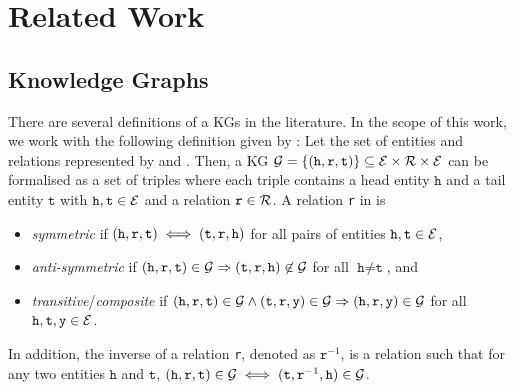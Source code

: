\chapter{Related Work}
\label{ch:relatedwork}

\section{Knowledge Graphs} 
There are several definitions of a \acp{KG} in the literature. 
In the scope of this work, we work with the following definition given by \cite{ConEx, RotatE}:
Let the set of entities and relations represented by \entities and \relations.
Then, a \ac{KG} $\mathcal{G}= \{(\texttt{h}, \texttt{r}, \texttt{t}) \}  \subseteq \mathcal{E} \times \mathcal{R} \times \mathcal{E}$ can be formalised as a set of triples where each triple contains a head entity $\texttt{h}$ and a tail entity $\texttt{t}$ with $\texttt{h}, \texttt{t} \in \mathcal{E}$ and a relation $\texttt{r} \in \mathcal{R}$. 
A relation \texttt{r} in \kg is
\begin{itemize}
    \item 
    \emph{symmetric} if $(\texttt{h}, \texttt{r}, \texttt{t}) \iff (\texttt{t}, \texttt{r}, \texttt{h})$ for all pairs of entities $\texttt{h},\texttt{t}\in \mathcal{E}$, 
   
   \item 
   \emph{anti-symmetric} if $(\texttt{h}, \texttt{r}, \texttt{t}) \in \mathcal{G} \Rightarrow (\texttt{t}, \texttt{r}, \texttt{h}) \not \in \mathcal{G}$ for all $\texttt{h} \not= \texttt{t}$, and
    
    \item 
    \emph{transitive}/\emph{composite} if $(\texttt{h}, \texttt{r}, \texttt{t})\in\mathcal{G} \wedge (\texttt{t}, \texttt{r}, \texttt{y}) \in \mathcal{G}  \Rightarrow (\texttt{h}, \texttt{r}, \texttt{y}) \in \mathcal{G}$ for all $\texttt{h},\texttt{t},\texttt{y}\in \mathcal{E}$.
\end{itemize}
In addition, the inverse of a relation \texttt{r}, denoted as $\texttt{r}^{-1}$, is a relation such that for any two entities $\texttt{h}$ and $\texttt{t}$, $(\texttt{h}, \texttt{r}, \texttt{t}) \in \mathcal{G} \iff (\texttt{t},\texttt{r}^{-1},\texttt{h}) \in \mathcal{G} $.

